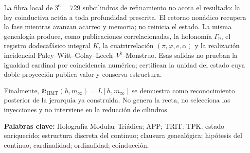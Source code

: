 La fibra local de \(3^6=729\) subcilindros de refinamiento no acota el
resultado: la ley coinductiva actúa a toda profundidad prescrita. El retorno
nonádico recupera la fase mientras avanzan acarreo y memoria; no reinicia el
estado. La misma genealogía produce, como publicaciones correlacionadas, la
holonomía \(\Gamma_9\), el registro dodecafásico integral \(K\), la
cuatrirrelación \((\pi,\varphi,e,\alpha)\) y la realización incidencial
Paley--Witt--Golay--Leech--\(V^\natural\)--Monstruo. Esas salidas no prueban
la igualdad cardinal por coincidencia numérica; certifican la unidad del
estado cuya doble proyección publica valor y conserva estructura.

Finalmente,
\(\mathfrak G_{\mathrm{HMT}}(h,m_\infty)=L[h,m_\infty]\) se demuestra como
reconocimiento posterior de la jerarquía ya construida. No genera la recta,
no selecciona las inyecciones y no interviene en la reducción de cilindros.

\medskip
\noindent\textbf{Palabras clave:} Holografía Modular Triádica; APP; TRIT;
TPK; estado enriquecido; estructura discreta del continuo; clausura
genealógica; hipótesis del continuo; cardinalidad; ordinalidad; coinducción.
\endgroup
